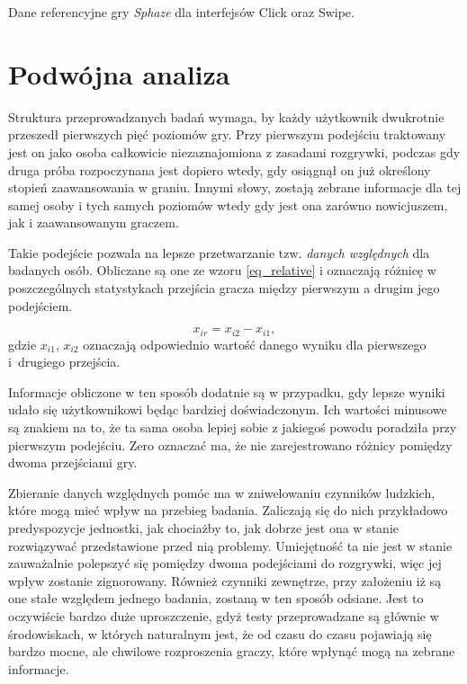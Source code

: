 \documentclass[a4paper,12pt,numbers=noenddot]{report}
\begin{document}
\begin{table}[H]
  \centering
  
  \caption{Dane referencyjne gry \textit{Sphaze} dla interfejsów Click oraz Swipe.}
	
  \label{tab:ref_data}%
\end{table}%

\section{Podwójna analiza}
Struktura przeprowadzanych badań wymaga, by każdy użytkownik dwukrotnie przeszedł pierwszych pięć poziomów gry. Przy pierwszym podejściu traktowany jest on jako osoba całkowicie niezaznajomiona z zasadami rozgrywki, podczas gdy druga próba rozpoczynana jest dopiero wtedy, gdy osiągnął on już określony stopień zaawansowania w graniu. Innymi słowy, zostają zebrane informacje dla tej samej osoby i tych samych poziomów wtedy gdy jest ona zarówno nowicjuszem, jak i zaawansowanym graczem. 

Takie podejście pozwala na lepsze przetwarzanie tzw. \textit{danych względnych} dla badanych osób. Obliczane są one ze wzoru \ref{eq_relative} i oznaczają różnicę w poszczególnych statystykach przejścia gracza między pierwszym a drugim jego podejściem. 

\begin{equation}
\label{eq_relative}
x_{ir} = x_{i2} - x_{i1},
\end{equation}
gdzie $x_{i1}$, $x_{i2}$ oznaczają odpowiednio wartość danego wyniku dla pierwszego i~drugiego przejścia.

Informacje obliczone w ten sposób dodatnie są w przypadku, gdy lepsze wyniki udało się użytkownikowi będąc bardziej doświadczonym. Ich wartości minusowe są znakiem na to, że ta sama osoba lepiej sobie z jakiegoś powodu poradziła przy pierwszym podejściu. Zero oznaczać ma, że nie zarejestrowano różnicy pomiędzy dwoma przejściami gry.

Zbieranie danych względnych pomóc ma w zniwelowaniu czynników ludzkich, które mogą mieć wpływ na przebieg badania. Zaliczają się do nich przykładowo predyspozycje jednostki, jak chociażby to, jak dobrze jest ona w stanie rozwiązywać przedstawione przed nią problemy. Umiejętność ta nie jest w stanie zauważalnie polepszyć się pomiędzy dwoma podejściami do rozgrywki, więc jej wpływ zostanie zignorowany.
Również czynniki zewnętrze, przy założeniu iż są one stałe względem jednego badania, zostaną w ten sposób odsiane. Jest to oczywiście bardzo duże uproszczenie, gdyż testy przeprowadzane są głównie w środowiskach, w których naturalnym jest, że od czasu do czasu pojawiają się bardzo mocne, ale chwilowe rozproszenia graczy, które wpłynąć mogą na zebrane informacje.
\end{document}
